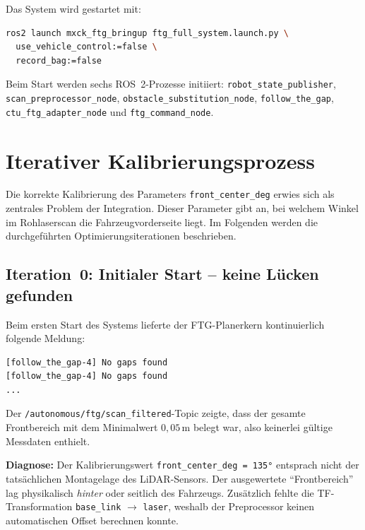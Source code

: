 Das System wird gestartet mit:

\begin{lstlisting}[language=bash, caption={Systemstart via Launch-Datei}]
ros2 launch mxck_ftg_bringup ftg_full_system.launch.py \
  use_vehicle_control:=false \
  record_bag:=false
\end{lstlisting}

Beim Start werden sechs ROS~2-Prozesse initiiert:
\texttt{robot\_state\_publisher}, \texttt{scan\_preprocessor\_node},
\texttt{obstacle\_substitution\_node}, \texttt{follow\_the\_gap},
\texttt{ctu\_ftg\_adapter\_node} und \texttt{ftg\_command\_node}.

\section{Iterativer Kalibrierungsprozess}
\label{sec:kalibrierung}

Die korrekte Kalibrierung des Parameters \texttt{front\_center\_deg}
erwies sich als zentrales Problem der Integration. Dieser Parameter
gibt an, bei welchem Winkel im Rohlaserscan die Fahrzeugvorderseite liegt.
Im Folgenden werden die durchgeführten Optimierungsiterationen beschrieben.

\subsection{Iteration~0: Initialer Start -- keine Lücken gefunden}

Beim ersten Start des Systems lieferte der FTG-Planerkern
kontinuierlich folgende Meldung:

\begin{lstlisting}[caption={Ausgabe des FTG-Kerns beim ersten Start}]
[follow_the_gap-4] No gaps found
[follow_the_gap-4] No gaps found
...
\end{lstlisting}

Der \texttt{/autonomous/ftg/scan\_filtered}-Topic zeigte, dass
der gesamte Frontbereich mit dem Minimalwert $0{,}05$\,m belegt war,
also keinerlei gültige Messdaten enthielt.

\textbf{Diagnose:} Der Kalibrierungswert \texttt{front\_center\_deg = 135°}
entsprach nicht der tatsächlichen Montagelage des LiDAR-Sensors.
Der ausgewertete ``Frontbereich'' lag physikalisch \emph{hinter}
oder seitlich des Fahrzeugs. Zusätzlich fehlte die TF-Transformation
\texttt{base\_link} $\to$ \texttt{laser}, weshalb der Preprocessor
keinen automatischen Offset berechnen konnte.

